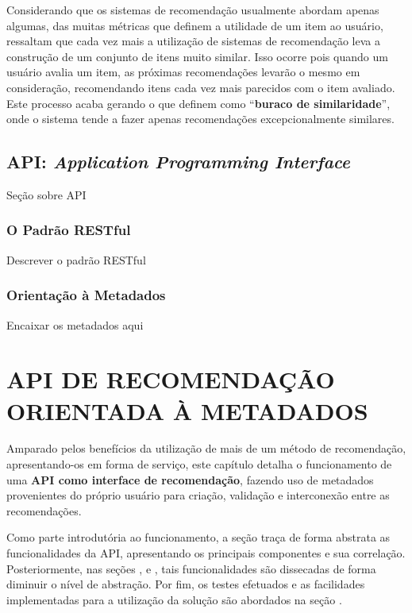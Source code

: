 \documentclass[12pt, openright, oneside, a4paper, brazil]{abntex2}
\begin{document}
Considerando que os sistemas de recomendação usualmente abordam apenas algumas, das muitas métricas que definem a utilidade de um item ao usuário,  ressaltam que cada vez mais a utilização de sistemas de recomendação leva a construção de um conjunto de itens muito similar. Isso ocorre pois quando um usuário avalia um item, as próximas recomendações levarão o mesmo em consideração, recomendando itens cada vez mais parecidos com o item avaliado. Este processo acaba gerando o que  definem como “\textbf{buraco de similaridade}”, onde o sistema tende a fazer apenas recomendações excepcionalmente similares.

\section{API: \textit{Application Programming Interface}}

Seção sobre API

\subsection{O Padrão RESTful}

Descrever o padrão RESTful

\subsection{Orientação à Metadados}

Encaixar os metadados aqui

%
%

\chapter{API DE RECOMENDAÇÃO ORIENTADA À METADADOS}

Amparado pelos benefícios da utilização de mais de um método de recomendação, apresentando-os em forma de serviço, este capítulo detalha o funcionamento de uma \textbf{API como interface de recomendação}, fazendo uso de metadados provenientes do próprio usuário para criação, validação e interconexão entre as recomendações.

Como parte introdutória ao funcionamento, a seção  traça de forma abstrata as funcionalidades da API, apresentando os principais componentes e sua correlação. Posteriormente, nas seções ,  e , tais funcionalidades são dissecadas de forma diminuir o nível de abstração. Por fim, os testes efetuados e as facilidades implementadas para a utilização da solução são abordados na seção .
\end{document}
